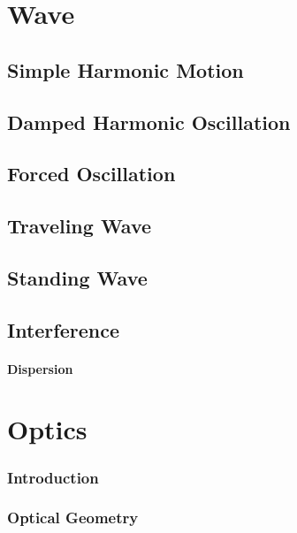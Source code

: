\documentclass[10pt]{report}
\begin{document}
\chapter*{Wave}

\section*{Simple Harmonic Motion}
\clearpage

\section*{Damped Harmonic Oscillation}
\clearpage

\section*{Forced Oscillation}
\clearpage

\section*{Traveling Wave}
\clearpage
\clearpage

\section*{Standing Wave}
\clearpage

\section*{Interference}
\clearpage
\clearpage

\subsubsection*{Dispersion}
\clearpage

\chapter*{Optics}
\subsection*{Introduction}
\clearpage

\subsection*{Optical Geometry}
\clearpage
\printbibliography
\end{document}
